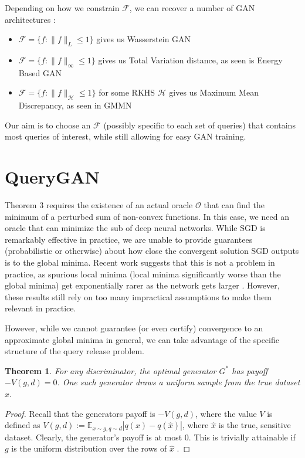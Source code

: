 \documentclass[]{article}
\newcommand{\F}{\mathcal{F}}
\newtheorem{theorem}{Theorem}[section]
\theoremstyle{definition}
\begin{document}
Depending on how we constrain $\mathcal{F}$, we can recover a number of GAN architectures \cite{zotero-1283}: 

\begin{itemize}
    \item $\F = \{f: \|f\|_L \leq 1\}$ gives us Wasserstein GAN \cite{ACB17}
    \item $\F = \{f: \|f\|_\infty \leq 1 \}$ gives us Total Variation distance, as seen is Energy Based GAN \cite{ZML17}
    \item $\F = \{f: \|f\|_\mathcal{H} \leq 1 \}$ for some RKHS $\mathcal{H}$  gives us Maximum Mean Discrepancy, as seen in GMMN \cite{LSZ15a}
\end{itemize}

Our aim is to choose an $\F$ (possibly specific to each set of queries) that contains most queries of interest, while still allowing for easy GAN training.  
    
\section{QueryGAN}

Theorem 3 requires the existence of an actual oracle $\mathcal{O}$ that can find the minimum of a perturbed sum of non-convex functions. In this case, we need an oracle that can minimize the sub of deep neural networks. While SGD is remarkably effective in practice, we are unable to provide guarantees (probabilistic or otherwise) about how close the convergent solution SGD outputs is to the global minima. Recent work suggests that this is not a problem in practice, as spurious local minima (local minima significantly worse than the global minima) get exponentially rarer as the network gets larger \cite{CHM+14}. However, these results still rely on too many impractical assumptions to make them relevant in practice. 

However, while we cannot guarantee (or even certify) convergence to an approximate global minima in general, we can take advantage of the specific structure of the query release problem. 

\begin{theorem}
    For any discriminator, the optimal generator $G^*$ has payoff $-V(g,d) = 0$. One such generator draws a uniform sample from the true dataset $\hat x$. 
\end{theorem}
\begin{proof}
    Recall that the generators payoff is  $-V(g,d)$, where the value $V$ is defined as $V(g,d) := \mathbb{E}_{x \sim g, q \sim d} |q(x) - q(\hat x)|$, where $\hat x$ is the true, sensitive dataset. Clearly, the generator's payoff is at most $0$. This is trivially attainable if $g$ is the uniform distribution over the rows of $\hat x$ .
\end{proof}
\end{document}
